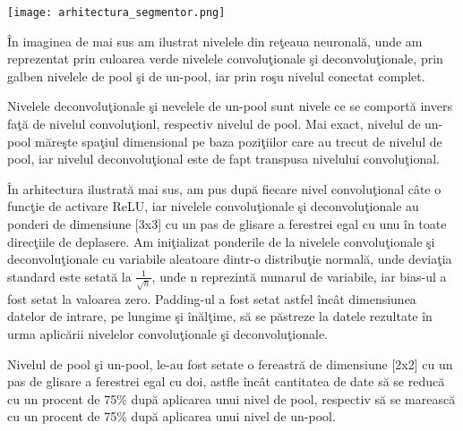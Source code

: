 \begin{center}
\texttt{[image: arhitectura\_segmentor.png]}
\end{center}

\^{I}n imaginea de mai sus am ilustrat nivelele din re\c{t}eaua neuronal\u{a}, unde am reprezentat prin culoarea verde nivelele convolu\c{t}ionale \c{s}i deconvolu\c{t}ionale, prin galben nivelele de pool \c{s}i de un-pool, iar prin ro\c{s}u nivelul conectat complet.

\par

Nivelele deconvolu\c{t}ionale \c{s}i nevelele de un-pool sunt nivele ce se comport\u{a} invers fa\c{t}\u{a} de nivelul convolu\c{t}ionl, respectiv nivelul de pool. Mai exact, nivelul de un-pool m\u{a}re\c{s}te spa\c{t}iul dimensional pe baza pozi\c{t}iilor care au trecut de nivelul de pool, iar nivelul deconvolu\c{t}ional este de fapt transpusa nivelului convolu\c{t}ional.

\par

\^{I}n arhitectura ilustrat\u{a} mai sus, am pus dup\u{a} fiecare nivel convolu\c{t}ional c\^{a}te o func\c{t}ie de activare ReLU, iar nivelele convolu\c{t}ionale \c{s}i deconvolu\c{t}ionale au ponderi de dimensiune [3x3] cu un pas de glisare a ferestrei egal cu unu \^{i}n toate direc\c{t}iile de deplasere. Am ini\c{t}ializat ponderile de la nivelele convolu\c{t}ionale \c{s}i deconvolu\c{t}ionale cu variabile aleatoare dintr-o distribu\c{t}ie normal\u{a}, unde devia\c{t}ia standard este setat\u{a} la $\frac{1}{\sqrt{n}}$, unde n reprezint\u{a} numarul de variabile, iar bias-ul a fost setat la valoarea zero. Padding-ul a fost setat astfel \^{i}nc\^{a}t dimensiunea datelor de intrare, pe lungime \c{s}i \^{i}n\u{a}l\c{t}ime, s\u{a} se p\u{a}streze la datele rezultate \^{i}n urma aplic\u{a}rii nivelelor convolu\c{t}ionale \c{s}i deconvolu\c{t}ionale.

\par

Nivelul de pool \c{s}i un-pool, le-au fost setate o fereastr\u{a} de dimensiune [2x2] cu un pas de glisare a ferestrei egal cu doi, astfle \^{i}nc\^{a}t cantitatea de date s\u{a} se reduc\u{a} cu un procent de 75\% dup\u{a} aplicarea unui nivel de pool, respectiv s\u{a} se mareasc\u{a} cu un procent de 75\% dup\u{a} aplicarea unui nivel de un-pool.

